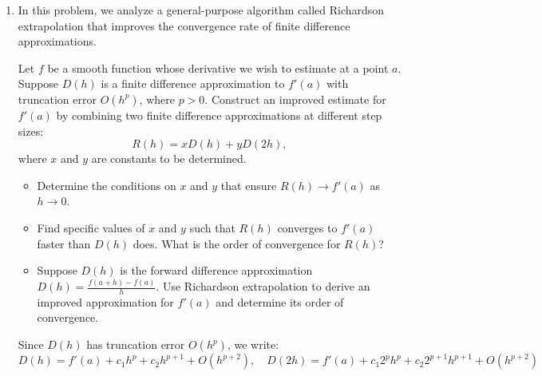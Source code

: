 \documentclass[reqno]{exam}
\begin{document}
\begin{enumerate}
\begin{solution}
Computing the numerator:
\begin{align*}
&f(-h) - 2f(0) + f(h)\\
&= \left[f(0) - hf'(0) + \frac{h^2}{2}f''(0) - \frac{h^3}{6}f'''(0) + \frac{h^4}{24}f^{(4)}(0)\right]\\
&\quad - 2f(0) + \left[f(0) + hf'(0) + \frac{h^2}{2}f''(0) + \frac{h^3}{6}f'''(0) + \frac{h^4}{24}f^{(4)}(0)\right] + O(h^5)\\
&= h^2f''(0) + \frac{h^4}{12}f^{(4)}(0) + O(h^5)
\end{align*}

Dividing by $h^2$:
$$\frac{f(-h) - 2f(0) + f(h)}{h^2} = f''(0) + \frac{h^2}{12}f^{(4)}(0) + O(h^3)$$

Therefore:
$$\tau_f(h) = -\frac{h^2}{12}f^{(4)}(0) + O(h^3)$$

Since the leading term of the truncation error is $O(h^2)$, the formula is \textbf{second-order accurate}.

$$\boxed{\tau_f(h) = O(h^2)}$$
\end{solution}

\item In this problem, we analyze a general-purpose algorithm called Richardson extrapolation that improves the convergence rate of finite difference approximations. 

Let $f$ be a smooth function whose derivative we wish to estimate at a point $a$. Suppose $D(h)$ is a finite difference approximation to $f'(a)$ with truncation error $O(h^p)$, where $p > 0$. 
Construct an improved estimate for $f'(a)$ by combining two finite difference approximations at different step sizes:
\[
R(h) = x D(h) + y D(2h),
\]
where $x$ and $y$ are constants to be determined.

\begin{itemize}
    \item Determine the conditions on $x$ and $y$ that ensure $R(h) \to f'(a)$ as $h \to 0$.
    \item Find specific values of $x$ and $y$ such that $R(h)$ converges to $f'(a)$ faster than $D(h)$ does. What is the order of convergence for $R(h)$?
    \item Suppose $D(h)$ is the forward difference approximation $D(h) = \frac{f(a+h) - f(a)}{h}$. Use Richardson extrapolation to derive an improved approximation for $f'(a)$ and determine its order of convergence.
\end{itemize}

\begin{solution}
    Since $D(h)$ has truncation error $O(h^p)$, we write:
\[
D(h) = f'(a) + c_1 h^p + c_2 h^{p+1} + O(h^{p+2}), \quad D(2h) = f'(a) + c_1 2^p h^p + c_2 2^{p+1} h^{p+1} + O(h^{p+2})
\]


\end{solution}
\end{enumerate}
\end{document}
